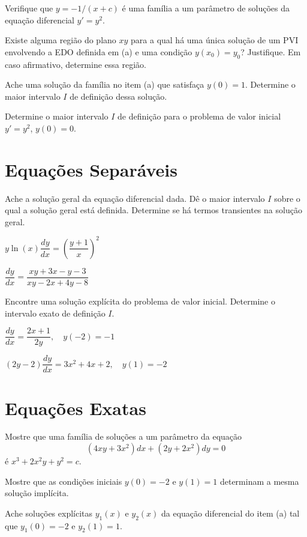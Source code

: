 \documentclass[oneside,12pt,a4paper]{report}
\begin{document}
\begin{itensquestao}
    \item Verifique que $y=-1/(x+c)$ é uma família a um parâmetro de soluções da equação diferencial $y'=y^2$.
    \item Existe alguma região do plano $xy$ para a qual há uma única solução de um PVI envolvendo a EDO definida em (a) e uma condição $y(x_0)=y_0$? Justifique. Em caso afirmativo, determine essa região.
    \item Ache uma solução da família no item (a) que satisfaça $y(0)=1$. Determine o maior intervalo $I$ de definição dessa solução.
    \item Determine o maior intervalo $I$ de definição para o problema de valor inicial $y'=y^2$, $y(0)=0$.
\end{itensquestao}

\section{Equações Separáveis}

 Ache a solução geral da equação diferencial dada. Dê o maior intervalo $I$ sobre o qual a solução geral está definida. Determine se há termos transientes na solução geral.
\begin{itensquestao}[2]
    \item $y\ln(x)\dfrac{dy}{dx}=\left(\dfrac{y+1}{x}\right)^2$
    \item $\dfrac{dy}{dx}=\dfrac{xy+3x-y-3}{xy-2x+4y-8}$
\end{itensquestao}

 Encontre uma solução explícita do problema de valor inicial. Determine o intervalo exato de definição $I$.
\begin{itensquestao}[2]
    \item $\dfrac{dy}{dx}=\dfrac{2x+1}{2y},\quad y(-2)=-1$
    \item $(2y-2)\dfrac{dy}{dx}=3x^2+4x+2,\quad y(1)=-2$
\end{itensquestao} 

\section{Equações Exatas}

\begin{itensquestao}
    \item Mostre que uma família de soluções a um parâmetro da equação
    \[(4xy+3x^2)dx+(2y+2x^2)dy=0\]
    é $x^3+2x^2y+y^2=c$.
    \item Mostre que as condições iniciais $y(0)=-2$ e $y(1)=1$ determinam a mesma solução implícita.
    \item Ache soluções explícitas $y_1(x)$ e $y_2(x)$ da equação diferencial do item (a) tal que $y_1(0)=-2$ e $y_2(1)=1$. 
\end{itensquestao}
\end{document}
